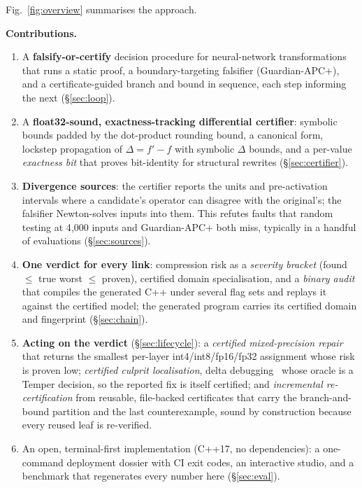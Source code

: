\documentclass[conference]{IEEEtran}
\begin{document}
Fig.~\ref{fig:overview} summarises the approach.

\textbf{Contributions.}
\begin{enumerate}
\item A \textbf{falsify-or-certify} decision procedure for neural-network transformations that runs a static proof, a boundary-targeting falsifier (Guardian-APC+), and a certificate-guided branch and bound in sequence, each step informing the next (\S\ref{sec:loop}).
\item A \textbf{float32-sound, exactness-tracking differential certifier}: symbolic bounds padded by the dot-product rounding bound, a canonical form, lockstep propagation of $\Delta=f'-f$ with symbolic $\Delta$ bounds, and a per-value \emph{exactness bit} that proves bit-identity for structural rewrites (\S\ref{sec:certifier}).
\item \textbf{Divergence sources}: the certifier reports the units and pre-activation intervals where a candidate's operator can disagree with the original's; the falsifier Newton-solves inputs into them. This refutes faults that random testing at 4{,}000 inputs and Guardian-APC+ both miss, typically in a handful of evaluations (\S\ref{sec:sources}).
\item \textbf{One verdict for every link}: compression risk as a \emph{severity bracket} (found $\le$ true worst $\le$ proven), certified domain specialisation, and a \emph{binary audit} that compiles the generated C++ under several flag sets and replays it against the certified model; the generated program carries its certified domain and fingerprint (\S\ref{sec:chain}).
\item \textbf{Acting on the verdict} (\S\ref{sec:lifecycle}): a \emph{certified mixed-precision repair} that returns the smallest per-layer int4/int8/fp16/fp32 assignment whose risk is proven low; \emph{certified culprit localisation}, delta debugging~\cite{ddmin} whose oracle is a Temper decision, so the reported fix is itself certified; and \emph{incremental re-certification} from reusable, file-backed certificates that carry the branch-and-bound partition and the last counterexample, sound by construction because every reused leaf is re-verified.
\item An open, terminal-first implementation (C++17, no dependencies): a one-command deployment dossier with CI exit codes, an interactive studio, and a benchmark that regenerates every number here (\S\ref{sec:eval}).
\end{enumerate}
\end{document}
